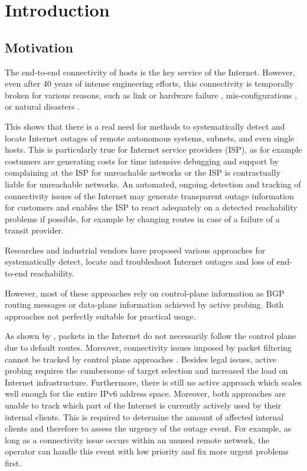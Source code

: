 

\chapter{Introduction}
\section{Motivation}

The end-to-end connectivity of hosts is the key service of the Internet.
However, even after 40 years of intense engineering efforts, this connectivity
is temporally broken for various reasons, such as link or hardware failure
\citep{Markopoulou:2008}, mis-configurations \citep{Mahajan:2002}, or natural
disasters \citep{Dainotti:2012:EBH,Schulman:2011}. 

This shows that there is a real need for methods to systematically detect and
locate Internet outages of remote autonomous systems, subnets, and even single
hosts. This is particularly true for Internet service providers (ISP), as for
example costumers are generating costs for time intensive debugging and support
by complaining at the ISP for unreachable networks or the ISP is contractually
liable for unreachable networks. An automated, ongoing detection and tracking of
connectivity issues of the Internet may generate transparent outage information
for customers and enables the ISP to react adequately on a detected reachability
problems if possible, for example by changing routes in case of a failure of a
transit provider. 

Researches and industrial vendors have proposed various approaches for
systematically detect, locate and troubleshoot Internet outages and loss of
end-to-end reachability.

However, most of these approaches rely on control-plane information as BGP
routing messages or data-plane information achieved by active probing. Both
approaches not perfectly suitable for practical usage.

As shown by \citet{Bush:Optometry}, packets in the Internet do not necessarily
follow the control plane due to default routes. Moreover, connectivity issues
imposed by packet filtering cannot be tracked by control plane approaches
\citep{Dainotti:2011:ACI}. Besides legal issues, active probing requires the
cumbersome of target selection and increased the load on Internet
infrastructure. Furthermore, there is still no active approach which scales well
enough for the entire IPv6 address space. Moreover, both approaches are unable
to track which part of the Internet is currently actively used by their internal
clients. This is required to determine the amount of affected internal clients
and therefore to assess the urgency of the outage event. For example, as long as
a connectivity issue occurs within an unused remote network, the operator can
handle this event with low priority and fix more urgent problems first.

